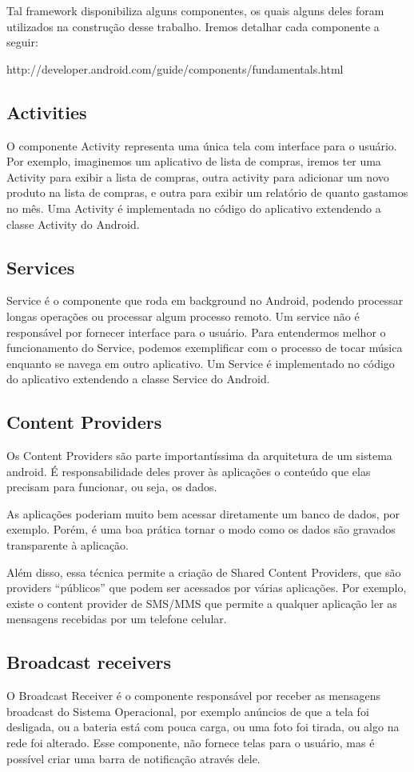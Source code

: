 \documentclass[12pt, %
openright, 
oneside,
a4paper,
brazil]{facom-ufu-abntex2}
\begin{document}
	Tal framework disponibiliza alguns componentes, os quais alguns deles foram utilizados na construção desse trabalho.
	Iremos detalhar cada componente a seguir:
	
	http://developer.android.com/guide/components/fundamentals.html

	\subsection{Activities}
	O componente Activity representa uma única tela com interface para o usuário. Por exemplo, imaginemos um aplicativo de lista de compras, iremos ter uma Activity para exibir a lista de compras, outra activity para adicionar um novo produto na lista de compras, e outra para exibir um relatório de quanto gastamos no mês.
	Uma Activity é implementada no código do aplicativo extendendo a classe Activity do Android.
	
	\subsection{Services}
	Service é o componente que roda em background no Android, podendo processar longas operações ou processar algum processo remoto. Um service não é responsável por fornecer interface para o usuário. Para entendermos melhor o funcionamento do Service, podemos exemplificar com o processo de tocar música enquanto se navega em outro aplicativo.
	Um Service é implementado no código do aplicativo extendendo a classe Service do Android.
	
	\subsection{Content Providers}
	Os Content Providers são parte importantíssima da arquitetura de um sistema android. É responsabilidade deles prover às aplicações o conteúdo que elas precisam para funcionar, ou seja, os dados.

As aplicações poderiam muito bem acessar diretamente um banco de dados, por exemplo. Porém, é uma boa prática tornar o modo como os dados são gravados transparente à aplicação. 

Além disso, essa técnica permite a criação de Shared Content Providers, que são providers “públicos” que podem ser acessados por várias aplicações. Por exemplo, existe o content provider de SMS/MMS que permite a qualquer aplicação ler as mensagens recebidas por um telefone celular.

	\subsection{Broadcast receivers}
	O Broadcast Receiver é o componente responsável por receber as mensagens broadcast do Sistema Operacional, por exemplo anúncios de que a tela foi desligada, ou a bateria está com pouca carga, ou uma foto foi tirada, ou algo na rede foi alterado. Esse componente, não fornece telas para o usuário, mas é possível criar uma barra de notificação através dele.
\end{document}
